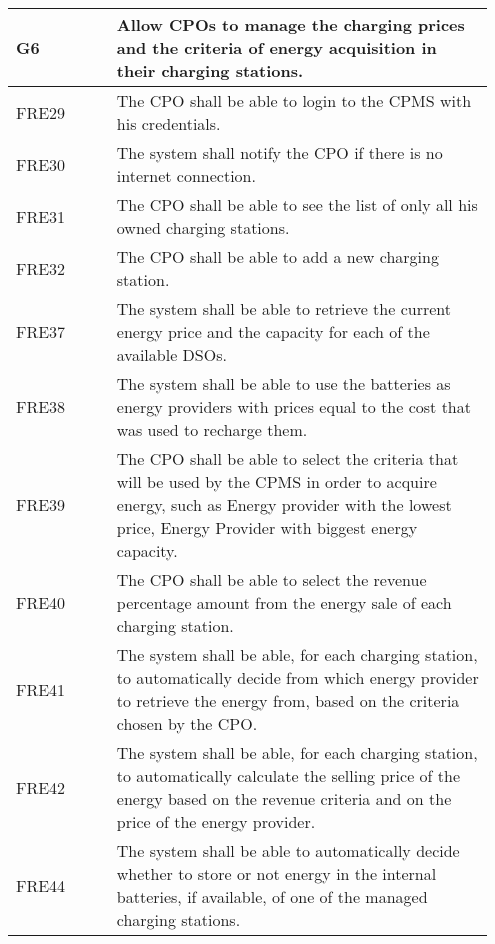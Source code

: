 {\renewcommand{\arraystretch}{1.5}
\begin{longtable}{|p{0.20\linewidth}p{0.75\linewidth} |}
    \hline
    \rowcolor{bluepoli!40}\textbf{G6} & \textbf{Allow CPOs to manage the charging prices and the criteria of energy acquisition in their charging stations.} \\
    \hline
    \rowcolor{bluepoli!15} FRE29 & The CPO shall be able to login to the CPMS with his credentials. \\
    \hline
    \rowcolor{bluepoli!15} FRE30 & The system shall notify the CPO if there is no internet connection. \\
    \hline
    \rowcolor{bluepoli!15} FRE31 & The CPO shall be able to see the list of only all his owned charging stations. \\
    \hline
    \rowcolor{bluepoli!15} FRE32 & The CPO shall be able to add a new charging station. \\
    \hline
    \rowcolor{bluepoli!15} FRE37 & The system shall be able to retrieve the current energy price and the capacity for each of the available DSOs. \\
    \hline
     \rowcolor{bluepoli!15} FRE38 & The system shall be able to use the batteries as energy providers with prices equal to the cost that was used to recharge them. \\
    \hline
     \rowcolor{bluepoli!15} FRE39& The CPO shall be able to select the criteria that will be used by the CPMS in order to acquire energy, such as Energy provider with the lowest price, Energy Provider with biggest energy capacity.\\
     \hline
     \rowcolor{bluepoli!15} FRE40 & The CPO shall be able to select the revenue percentage amount from the energy sale of each charging station.\\
    \hline
    \rowcolor{bluepoli!15} FRE41 & The system shall be able, for each charging station, to automatically decide from which energy provider to retrieve the energy from, based on the criteria chosen by the CPO.\\
    \hline
    \rowcolor{bluepoli!15} FRE42 & The system shall be able, for each charging station, to automatically calculate the selling price of the energy based on the revenue criteria and on the price of the energy provider.\\
    \hline 
    \rowcolor{bluepoli!15} FRE44 &  The system shall be able to automatically decide whether to store or not energy in the internal batteries, if available, of one of the managed charging stations.\\

\end{longtable}}
